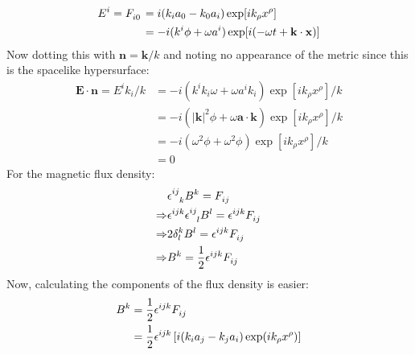 \documentclass[12pt,a4]{article}
\begin{document}
\begin{enumerate}
\begin{enumerate}
        \begin{align*}
          E^i = \tensor{F}{_i_0} &= i(k_i a_0 - k_0 a_i) \exp[ik_\rho x^\rho]\\
                                 &= - i(k^i \phi + \omega a^i) \exp[i(-\omega t + \mathbf{k}\cdot \mathbf{x})]\\
        \end{align*}
        Now dotting this with $\mathbf{n} = \mathbf{k} / k$ and noting no appearance of the metric since this is the spacelike hypersurface:
        \begin{align*}
          \mathbf{E} \cdot \mathbf{n} =  E^i k_i / k &=  - i(k^i k_i\omega + \omega a^i k_i) \exp[ik_\rho x^\rho] / k\\
                                                     &=  - i(|\mathbf{k}|^2 \phi + \omega \mathbf{a} \cdot \mathbf{k}) \exp[ik_\rho x^\rho] / k\\
                                                     &=  - i(\omega^2 \phi + \omega^2 \phi) \exp[ik_\rho x^\rho] / k\\
                                                     &= 0
        \end{align*}
        For the magnetic flux density:
        \begin{align*}
                      & \tensor{\epsilon}{^i^j_k} B^k = \tensor{F}{_i_j} \\
          \Rightarrow & \tensor{\epsilon}{^i^j^k}\tensor{\epsilon}{^i^j_l} B^l = \tensor{\epsilon}{^i^j^k} \tensor{F}{_i_j} \\
          \Rightarrow & 2\delta^k_l B^l = \tensor{\epsilon}{^i^j^k} \tensor{F}{_i_j} \\
          \Rightarrow & B^k = \frac{1}{2}\tensor{\epsilon}{^i^j^k} \tensor{F}{_i_j} 
        \end{align*}
        Now, calculating the components of the flux density is easier:
        \begin{align*}
          B^k &= \frac{1}{2}\tensor{\epsilon}{^i^j^k} \tensor{F}{_i_j} \\
              &= \frac{1}{2}\tensor{\epsilon}{^i^j^k} \left[i(k_i a_j - k_j a_i) \exp(ik_\rho x^\rho)\right] \\

\end{align*}
\end{enumerate}
\end{enumerate}
\end{document}
